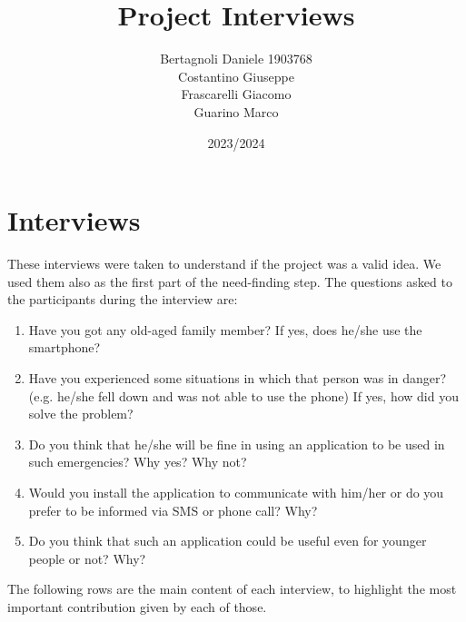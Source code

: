 \documentclass[12pt]{article}
\title{Project Interviews}
\author{Bertagnoli Daniele 1903768 \\ Costantino Giuseppe \\ Frascarelli Giacomo \\ Guarino Marco}
\date{2023/2024}
\begin{document}
\maketitle

\tableofcontents
\newpage

\section{Interviews}
These interviews were taken to understand if the project was a valid idea. We used them also as the first part of the need-finding step. The questions asked to the participants during the interview are:
\begin{enumerate}
    \item Have you got any old-aged family member? If yes, does he/she use the smartphone?
    \item Have you experienced some situations in which that person was in danger? (e.g. he/she fell down and was not able to use the phone) If yes, how did you solve the problem?
    \item Do you think that he/she will be fine in using an application to be used in such emergencies? Why yes? Why not?
    \item Would you install the application to communicate with him/her or do you prefer to be informed via SMS or phone call? Why?
    \item Do you think that such an application could be useful even for younger people or not? Why?
\end{enumerate}

The following rows are the main content of each interview, to highlight the most important contribution given by each of those.
\end{document}
